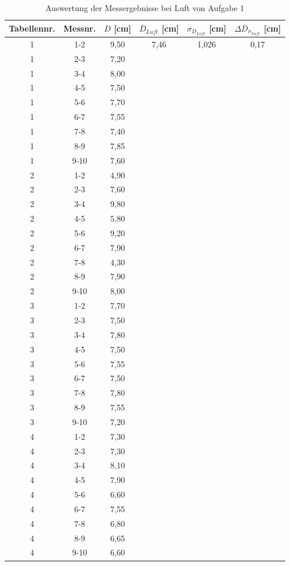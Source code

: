 \documentclass{article}
\begin{document}
\begin{table}[p]
    \centering
    \caption{Auswertung der Messergebnisse bei Luft von Aufgabe 1}
    \begin{tabular}{c|c|c|c|c|c}
        Tabellennr. & Messnr. & $D$ [cm] & $\overline{D}_{Luft}$ [cm] & $\sigma_{D_{Luft}}$ [cm] & $\Delta \overline{D}_{\sigma_{Luft}}$ [cm] \\ \hline
        1 & 1-2 & 9,50 & 7,46 & 1,026 & 0,17 \\
        1 & 2-3 & 7,20 &  &  & \\
        1 & 3-4 & 8,00 &  &  & \\
        1 & 4-5 & 7,50 &  &  & \\
        1 & 5-6 & 7,70 &  &  & \\
        1 & 6-7 & 7,55 &  &  & \\
        1 & 7-8 & 7,40 &  &  & \\
        1 & 8-9 & 7,85 &  &  & \\
        1 & 9-10 & 7,60 &  &  & \\ \cline{1-3}
        2 & 1-2 & 4,90 &  &  & \\
        2 & 2-3 & 7,60 &  &  & \\
        2 & 3-4 & 9,80 &  &  & \\
        2 & 4-5 & 5,80 &  &  & \\
        2 & 5-6 & 9,20 &  &  & \\
        2 & 6-7 & 7,90 &  &  & \\
        2 & 7-8 & 4,30 &  &  & \\
        2 & 8-9 & 7,90 &  &  & \\
        2 & 9-10 & 8,00 &  &  & \\ \cline{1-3}
        3 & 1-2 & 7,70 &  &  & \\
        3 & 2-3 & 7,50 &  &  & \\
        3 & 3-4 & 7,80 &  &  & \\
        3 & 4-5 & 7,50 &  &  & \\
        3 & 5-6 & 7,55 &  &  & \\
        3 & 6-7 & 7,50 &  &  & \\
        3 & 7-8 & 7,80 &  &  & \\
        3 & 8-9 & 7,55 &  &  & \\
        3 & 9-10 & 7,20 &  &  & \\ \cline{1-3}
        4 & 1-2 & 7,30 &  &  & \\
        4 & 2-3 & 7,30 &  &  & \\
        4 & 3-4 & 8,10 &  &  & \\
        4 & 4-5 & 7,90 &  &  & \\
        4 & 5-6 & 6,60 &  &  & \\
        4 & 6-7 & 7,55 &  &  & \\
        4 & 7-8 & 6,80 &  &  & \\
        4 & 8-9 & 6,65 &  &  & \\
        4 & 9-10 & 6,60 &  &  &  
\end{tabular}
\end{table}
\end{document}
